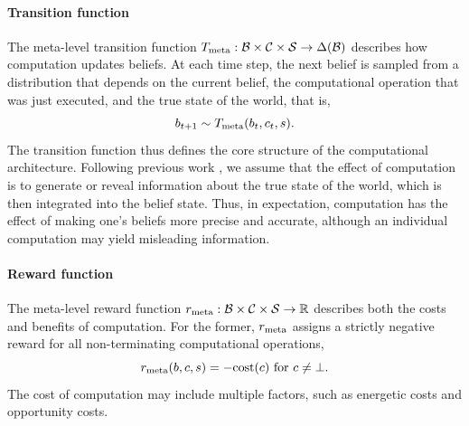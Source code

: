 \paragraph{Transition function}
The meta-level transition function $T_{\text{meta}}: \mathcal{B} \times \mathcal{C} \times \mathcal{S} \rightarrow \Delta(\mathcal{B})$ describes how computation updates beliefs. At each time step, the next belief is sampled from a distribution that depends on the current belief, the computational operation that was just executed, and the true state of the world, that is,
\begin{equation}
b_{t+1} \sim T_{\text{meta}}(b_t, c_t, s).
\end{equation}
The transition function thus defines the core structure of the computational architecture. Following previous work \citep{Matheson1968,hay2012}, we assume that the effect of computation is to generate or reveal information about the true state of the world, which is then integrated into the belief state. Thus, in expectation, computation has the effect of making one's beliefs more precise and accurate, although an individual computation may yield misleading information. 



\paragraph{Reward function}
The meta-level reward function $r_{\text{meta}}: \mathcal{B} \times \mathcal{C} \times \mathcal{S} \rightarrow \mathbb{R}$ describes both the costs and benefits of computation. For the former, $r_{\text{meta}}$ assigns a strictly negative reward for all non-terminating computational operations,
%
\begin{equation}
r_{\text{meta}}(b, c, s) = -\text{cost}(c) \text{ for } c \neq \bot.
\end{equation}
%
The cost of computation may include multiple factors, such as energetic costs and opportunity costs. 

